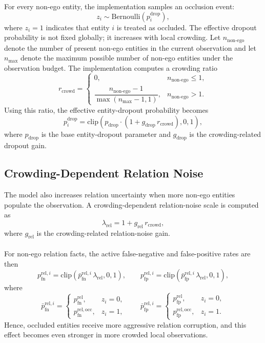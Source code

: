 For every non-ego entity, the implementation samples an occlusion event:
\[
z_i \sim \mathrm{Bernoulli}(p_i^{\mathrm{drop}}),
\]
where \(z_i = 1\) indicates that entity \(i\) is treated as occluded. The effective dropout probability is not fixed globally; it increases with local crowding. Let \(n_{\mathrm{non\text{-}ego}}\) denote the number of present non-ego entities in the current observation and let \(n_{\max}\) denote the maximum possible number of non-ego entities under the observation budget. The implementation computes a crowding ratio
\[
r_{\mathrm{crowd}} =
\begin{cases}
0, & n_{\mathrm{non\text{-}ego}} \le 1,\\
\dfrac{n_{\mathrm{non\text{-}ego}} - 1}{\max(n_{\max} - 1, 1)}, & n_{\mathrm{non\text{-}ego}} > 1.
\end{cases}
\]
Using this ratio, the effective entity-dropout probability becomes
\[
p_i^{\mathrm{drop}}

=
\mathrm{clip}\!\left(
p_{\mathrm{drop}} \cdot
\left(1 + g_{\mathrm{drop}}\, r_{\mathrm{crowd}}\right),
0, 1
\right),
\]
where \(p_{\mathrm{drop}}\) is the base entity-dropout parameter and \(g_{\mathrm{drop}}\) is the crowding-related dropout gain.

\subsection{Crowding-Dependent Relation Noise}

The model also increases relation uncertainty when more non-ego entities populate the observation. A crowding-dependent relation-noise scale is computed as
\[
\lambda_{\mathrm{rel}} = 1 + g_{\mathrm{rel}}\, r_{\mathrm{crowd}},
\]
where \(g_{\mathrm{rel}}\) is the crowding-related relation-noise gain.
\\
\\
For non-ego relation facts, the active false-negative and false-positive rates are then
\[
p_{\mathrm{fn}}^{\mathrm{rel},i} =
\mathrm{clip}\!\left(
\bar{p}_{\mathrm{fn}}^{\mathrm{rel},i}\,\lambda_{\mathrm{rel}},
0, 1
\right),
\qquad
p_{\mathrm{fp}}^{\mathrm{rel},i} =
\mathrm{clip}\!\left(
\bar{p}_{\mathrm{fp}}^{\mathrm{rel},i}\,\lambda_{\mathrm{rel}},
0, 1
\right),
\]
where
\[
\bar{p}_{\mathrm{fn}}^{\mathrm{rel},i}
=
\begin{cases}
p_{\mathrm{fn}}^{\mathrm{rel}}, & z_i = 0,\\
p_{\mathrm{fn}}^{\mathrm{rel,occ}}, & z_i = 1,
\end{cases}
\qquad
\bar{p}_{\mathrm{fp}}^{\mathrm{rel},i}
=
\begin{cases}
p_{\mathrm{fp}}^{\mathrm{rel}}, & z_i = 0,\\
p_{\mathrm{fp}}^{\mathrm{rel,occ}}, & z_i = 1.
\end{cases}
\]
\noindent Hence, occluded entities receive more aggressive relation corruption, and this effect becomes even stronger in more crowded local observations.

